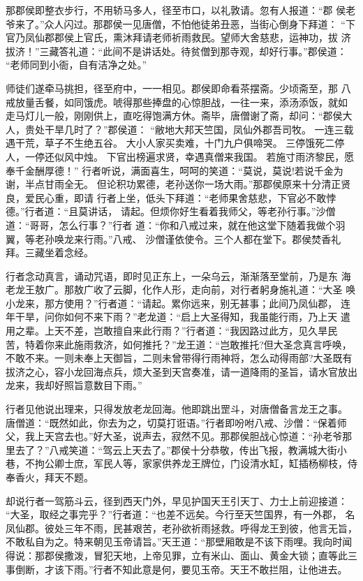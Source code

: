 那郡侯即整衣步行，不用轿马多人，径至市口，以礼敦请。忽有人报道：“郡
侯老爷来了。”众人闪过。那郡侯一见唐僧，不怕他徒弟丑恶，当街心倒身下拜道：
“下官乃凤仙郡郡侯上官氏，熏沐拜请老师祈雨救民。望师大舍慈悲，运神功，拔
济拔济！”三藏答礼道：“此间不是讲话处。待贫僧到那寺观，却好行事。”郡侯道：
“老师同到小衙，自有洁净之处。”

师徒们遂牵马挑担，径至府中，一一相见。郡侯即命看茶摆斋。少顷斋至，那
八戒放量舌餐，如同饿虎。唬得那些捧盘的心惊胆战，一往一来，添汤添饭，就如
走马灯儿一般，刚刚供上，直吃得饱满方休。斋毕，唐僧谢了斋，却问：“郡侯大
人，贵处干旱几时了？”郡侯道：
“敝地大邦天竺国，凤仙外郡吾司牧。
一连三载遇干荒，草子不生绝五谷。
大小人家买卖难，十门九户俱啼哭。
三停饿死二停人，一停还似风中烛。
下官出榜遍求贤，幸遇真僧来我国。
若施寸雨济黎民，愿奉千金酬厚德！”
行者听说，满面喜生，呵呵的笑道：“莫说，莫说!若说千金为谢，半点甘雨全无。
但论积功累德，老孙送你一场大雨。”那郡侯原来十分清正贤良，爱民心重，即请
行者上坐，低头下拜道：“老师果舍慈悲，下官必不敢悖德。”行者道：“且莫讲话，
请起。但烦你好生看着我师父，等老孙行事。”沙僧道：“哥哥，怎么行事？”行者
道：“你和八戒过来，就在他这堂下随着我做个羽翼，等老孙唤龙来行雨。”八戒、
沙僧谨依使令。三个人都在堂下。郡侯焚香礼拜。三藏坐着念经。

行者念动真言，诵动咒语，即时见正东上，一朵乌云，渐渐落至堂前，乃是东
海老龙王敖广。那敖广收了云脚，化作人形，走向前，对行者躬身施礼道：“大圣
唤小龙来，那方使用？”行者道：“请起。累你远来，别无甚事；此间乃凤仙郡，
连年干旱，问你如何不来下雨？”老龙道：“启上大圣得知，我虽能行雨，乃上天
遣用之辈。上天不差，岂敢擅自来此行雨？”行者道：“我因路过此方，见久旱民
苦，特着你来此施雨救济，如何推托？”龙王道：“岂敢推托?但大圣念真言呼唤，
不敢不来。一则未奉上天御旨，二则未曾带得行雨神将，怎么动得雨部?大圣既有
拔济之心，容小龙回海点兵，烦大圣到天宫奏准，请一道降雨的圣旨，请水官放出
龙来，我却好照旨意数目下雨。”

行者见他说出理来，只得发放老龙回海。他即跳出罡斗，对唐僧备言龙王之事。
唐僧道：“既然如此，你去为之，切莫打诳语。”行者即吩咐八戒、沙僧：“保着师
父，我上天宫去也。”好大圣，说声去，寂然不见。那郡侯胆战心惊道：“孙老爷那
里去了？”八戒笑道：“驾云上天去了。”郡侯十分恭敬，传出飞报，教满城大街小
巷，不拘公卿士庶，军民人等，家家供养龙王牌位，门设清水缸，缸插杨柳枝，侍
奉香火，拜天不题。

却说行者一驾筋斗云，径到西天门外，早见护国天王引天丁、力士上前迎接道：
“大圣，取经之事完乎？”行者道：“也差不远矣。今行至天竺国界，有一外郡，
名凤仙郡。彼处三年不雨，民甚艰苦，老孙欲祈雨拯救。呼得龙王到彼，他言无旨，
不敢私自为之。特来朝见玉帝请旨。”天王道：“那壁厢敢是不该下雨哩。我向时闻
得说：那郡侯撒泼，冒犯天地，上帝见罪，立有米山、面山、黄金大锁；直等此三
事倒断，才该下雨。”行者不知此意是何，要见玉帝。天王不敢拦阻，让他进去。

